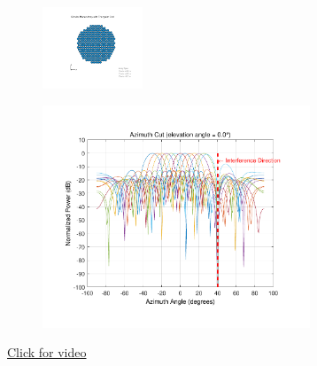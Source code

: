 \documentclass{ctexbeamer}
\begin{document}
\begin{frame}
\begin{figure}
        \includegraphics[width=3cm]{2-10.pdf}
    \end{figure}
\end{frame}

\begin{frame}
    \begin{figure}
        \includegraphics[width=8cm]{2-1.pdf}
    \end{figure}
\end{frame}

\begin{frame}
    \href{run:D:/01.yangjing/Codes/GitHub/MATLAB/Microwave_Antenna_RF/LHCP.avi}{Click for video}
\end{frame}
\end{document}
